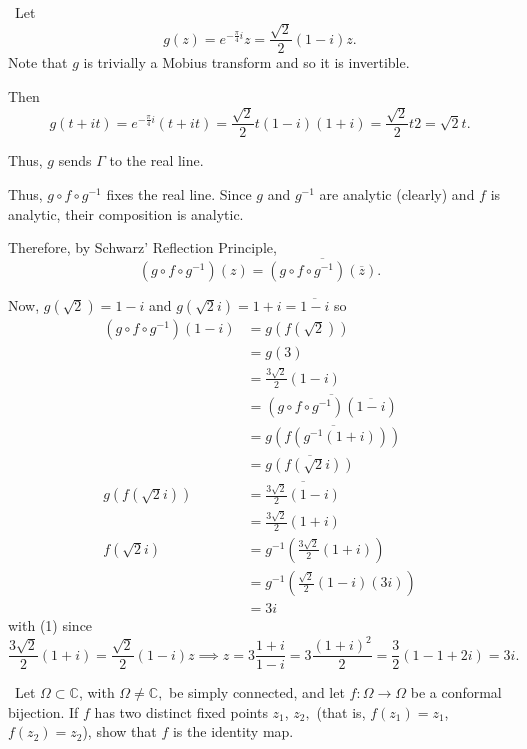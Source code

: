 \documentclass[12pt]{Qual}
\begin{document}
\begin{solution}$\,$
Let $$g(z)=e^{-\frac{\pi}{4}i}z=\frac{\sqrt{2}}{2}(1-i)z.$$ Note that $g$ is trivially a Mobius transform and so it is invertible.

Then $$g(t+it)=e^{-\frac{\pi}{4}i}(t+it)=\frac{\sqrt{2}}{2}t(1-i)(1+i)=\frac{\sqrt{2}}{2}t2=\sqrt{2}t.$$

Thus, $g$ sends $\Gamma$ to the real line.

Thus, $g\circ f\circ g^{-1}$ fixes the real line. Since $g$ and $g^{-1}$ are analytic (clearly) and $f$ is analytic, their composition is analytic.

Therefore, by Schwarz' Reflection Principle, $$(g\circ f\circ g^{-1})(z)=\overline{(g\circ f\circ g^{-1})(\overline{z})}.$$

Now, $g(\sqrt{2})=1-i$ and $g(\sqrt{2}i)=1+i=\overline{1-i}$ so \begin{align*}
    (g\circ f\circ g^{-1})(1-i)&=g(f(\sqrt{2}))\\
    &=g(3)\\
    &=\frac{3\sqrt{2}}{2}(1-i)\\
    &=\overline{(g\circ f\circ g^{-1})(\overline{1-i})}\\
    &=\overline{g(f(g^{-1}(1+i)))}\\
    &=\overline{g(f(\sqrt{2}i))}\\
    g(f(\sqrt{2}i))&=\overline{\frac{3\sqrt{2}}{2}(1-i)}\\
    &=\frac{3\sqrt{2}}{2}(1+i)\\
    f(\sqrt{2}i)&=g^{-1}(\frac{3\sqrt{2}}{2}(1+i))\\
    &=g^{-1}(\frac{\sqrt{2}}{2}(1-i)(3i))\tag{1}\\
    &=3i
\end{align*} with (1) since $$\frac{3\sqrt{2}}{2}(1+i)=\frac{\sqrt{2}}{2}(1-i)z\implies z=3\frac{1+i}{1-i}=3\frac{(1+i)^2}{2}=\frac{3}{2}(1-1+2i)=3i.$$

\end{solution}
\newpage





\begin{problem} $\,$
Let $\Omega\subset\mathbb{C}$, with $\Omega\not=\mathbb{C},$ be simply connected, and let $f:\Omega\to\Omega$ be a conformal bijection. If $f$ has two distinct fixed points $z_1$, $z_2,$ (that is, $f(z_1)=z_1$, $f(z_2)=z_2$), show that $f$ is the identity map.
\end{problem}
\end{document}
